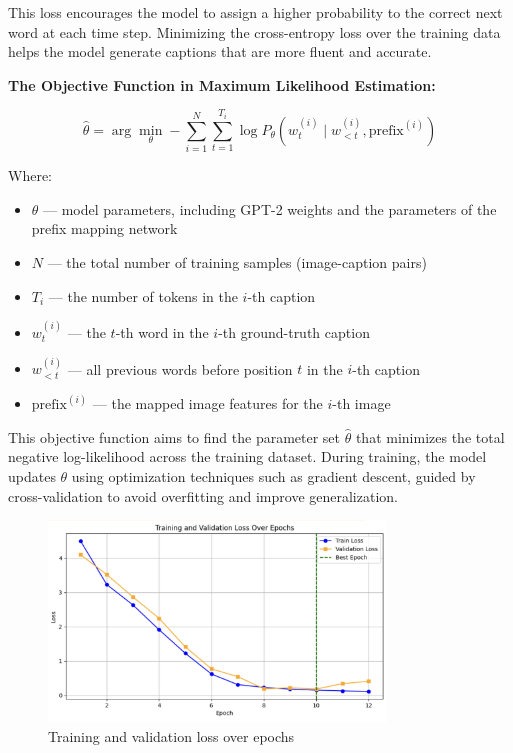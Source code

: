 \documentclass[11pt]{article}
\begin{document}
This loss encourages the model to assign a higher 
probability to the correct next word at each time step. 
Minimizing the cross-entropy loss over the training data 
helps the model generate captions that are more fluent 
and accurate.

\pagebreak
\textbf{The Objective Function in Maximum Likelihood Estimation:}

\begin{equation}
\hat{\theta} = \arg\min_{\theta} -\sum_{i=1}^{N} \sum_{t=1}^{T_i} \log P_\theta(w_t^{(i)} \mid w_{<t}^{(i)}, \text{prefix}^{(i)})
\end{equation}

Where:
\begin{itemize}
    \item $\theta$ — model parameters, including GPT-2 weights and the parameters of the prefix mapping network  
    \item $N$ — the total number of training samples (image-caption pairs)  
    \item $T_i$ — the number of tokens in the $i$-th caption  
    \item $w_t^{(i)}$ — the $t$-th word in the $i$-th ground-truth caption  
    \item $w_{<t}^{(i)}$ — all previous words before position $t$ in the $i$-th caption  
    \item $\text{prefix}^{(i)}$ — the mapped image features for the $i$-th image
\end{itemize}

This objective function aims to find the parameter set $\hat{\theta}$ that minimizes the total negative log-likelihood 
across the training dataset. During training, the model updates $\theta$ using optimization 
techniques such as gradient descent, guided by cross-validation to avoid overfitting and improve generalization.
\begin{figure}[h]
    \centering
    \includegraphics[width=0.8\textwidth]{f2.png}
    \caption{Training and validation loss over epochs}
    \end{figure}
\pagebreak
\end{document}
